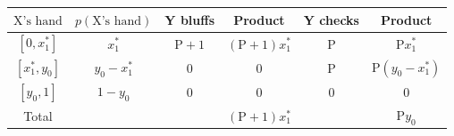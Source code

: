 \documentclass[border=3pt]{standalone}
\begin{document}
{\Large
\renewcommand{\arraystretch}{1.3}
\begin{tabular}{|c|c|c|c|c|c|}
\hline
    $\mathrm{X}\text{'s hand}$ &
    $p(\mathrm{X}\text{'s hand})$ &
    Y bluffs &
    Product &
    Y checks &
    Product \\
\hline
    $[0, x_1^*]$ &
    $x_1^*$ &
    $\mathrm{P}+1$ &
    $(\mathrm{P}+1)x_1^*$ &
    $\mathrm{P}$ &
    $\mathrm{P}x_1^*$ \\
\hline
    $[x_1^*, y_0]$ &
    $y_0 - x_1^*$ &
    $0$ &
    $0$ &
    $\mathrm{P}$ &
    $\mathrm{P}(y_0 - x_1^*)$ \\
\hline
    $[y_0, 1]$ &
    $1 - y_0$ &
    $0$ &
    $0$ &
    $0$ &
    $0$ \\
\hline
    Total & & & $(\mathrm{P}+1)x_1^*$ & & $\mathrm{P}y_0$ \\
\hline
\end{tabular}
}
\end{document}
